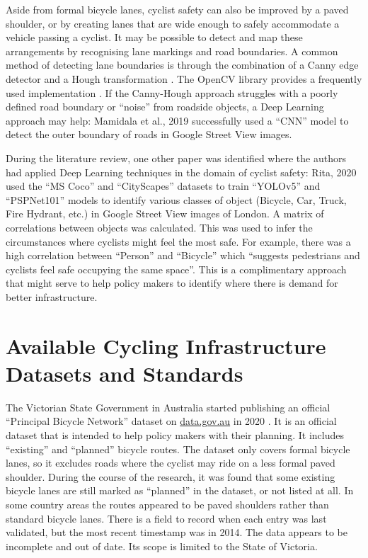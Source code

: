\documentclass[11pt,twoside]{report}
\begin{document}
Aside from formal bicycle lanes, cyclist safety can also be improved by a paved shoulder, or by creating lanes that are wide enough to safely accommodate a vehicle passing a cyclist.  It may be possible to detect and map these arrangements by recognising lane markings and road boundaries.  A common method of detecting lane boundaries is through the combination of a Canny edge detector \cite{canny} and a Hough transformation \cite{hough}.  The OpenCV library provides a frequently used implementation \cite{opencv}.  If the Canny-Hough approach struggles with a poorly defined road boundary or ``noise'' from roadside objects, a Deep Learning approach may help:  Mamidala et al., 2019 \cite{8929655} successfully used a ``CNN'' model to detect the outer boundary of roads in Google Street View images.

During the literature review, one other paper was identified where the authors had applied Deep Learning techniques in the domain of cyclist safety:  Rita, 2020 \cite{rita_2020} used the ``MS Coco'' and ``CityScapes'' datasets to train ``YOLOv5'' and ``PSPNet101'' models to identify various classes of object (Bicycle, Car, Truck, Fire Hydrant, etc.) in Google Street View images of London.  A matrix of correlations between objects was calculated.  This was used to infer the circumstances where cyclists might feel the most safe.  For example, there was a high correlation between ``Person'' and ``Bicycle'' which ``suggests pedestrians and cyclists feel safe occupying the same space''.  This is a complimentary approach that might serve to help policy makers to identify where there is demand for better infrastructure.


\section{Available Cycling Infrastructure Datasets and Standards}
\label{s:datasets}

The Victorian State Government in Australia started publishing an official ``Principal Bicycle Network'' dataset on \url{data.gov.au} in 2020 \cite{PrincipalBicycleNetwork}.  It is an official dataset that is intended to help policy makers with their planning.  It includes ``existing'' and ``planned'' bicycle routes.  The dataset only covers formal bicycle lanes, so it excludes roads where the cyclist may ride on a less formal paved shoulder.  During the course of the research, it was found that some existing bicycle lanes are still marked as ``planned'' in the dataset, or not listed at all.  In some country areas the routes appeared to be paved shoulders rather than standard bicycle lanes.  There is a field to record when each entry was last validated, but the most recent timestamp was in 2014.  The data appears to be incomplete and out of date.  Its scope is limited to the State of Victoria.
\end{document}
